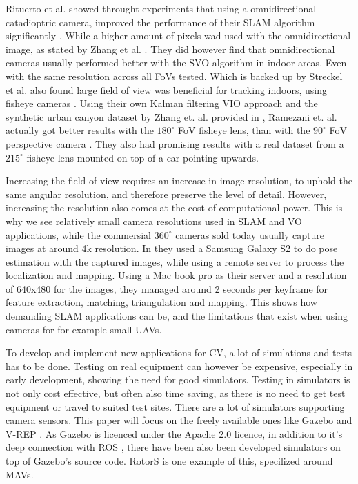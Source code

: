 Rituerto et al. showed throught experiments that using a omnidirectional catadioptric camera, improved the performance of their SLAM algorithm significantly \cite{CompOmniConvVSLAM}. While a higher amount of pixels wad used with the omnidirectional image, as stated by Zhang et al. \cite{Zhang2016BenefitOL}. They did however find that omnidirectional cameras usually performed better with the SVO algorithm in indoor areas. Even with the same resolution across all FoVs tested. Which is backed up by Streckel et al. also found large field of view was beneficial for tracking indoors, using fisheye cameras \cite{OMNIChooseLensVisual}. Using their own Kalman filtering VIO approach and the synthetic urban canyon dataset by Zhang et. al. provided in \cite{Zhang2016BenefitOL}, Ramezani et. al. actually got better results with the $180^\circ$ FoV fisheye lens, than with the $90^\circ$ FoV perspective camera \cite{OmniVIOKalman}. They also had promising results with a real dataset from a $215^\circ$ fisheye lens mounted on top of a car pointing upwards.

Increasing the field of view requires an increase in image resolution, to uphold the same angular resolution, and therefore preserve the level of detail. However, increasing the resolution also comes at the cost of computational power. This is why we see relatively small camera resolutions used in SLAM and VO applications, while the commersial $360^\circ$ cameras sold today usually capture images at around 4k resolution. In \cite{MobileSLAM} they used a Samsung Galaxy S2 to do pose estimation with the captured images, while using a remote server to process the localization and mapping. Using a Mac book pro as their server and a resolution of 640x480 for the images, they managed around 2 seconds per keyframe for feature extraction, matching, triangulation and mapping. This shows how demanding SLAM applications can be, and the limitations that exist when using cameras for for example small UAVs. 

To develop and implement new applications for CV, a lot of simulations and tests has to be done. Testing on real equipment can however be expensive, especially in early development, showing the need for good simulators. Testing in simulators is not only cost effective, but often also time saving, as there is no need to get test equipment or travel to suited test sites. There are a lot of simulators supporting camera sensors. This paper will focus on the freely available ones like Gazebo \cite{GazeboPaper} and V-REP \cite{VREP2013}. As Gazebo is licenced under the Apache 2.0 licence, in addition to it's deep connection with ROS \cite{ROSpaper}, there have been also been developed simulators on top of Gazebo's source code. RotorS \cite{RotorS} is one example of this, specilized around MAVs. 

